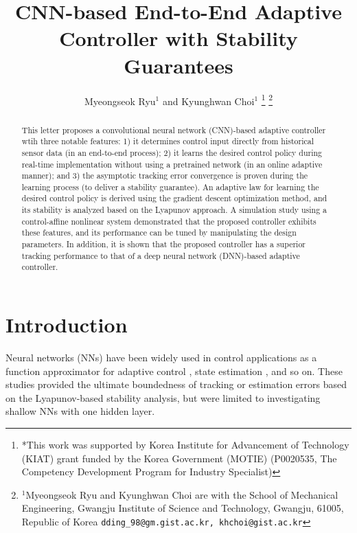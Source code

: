 \documentclass[letterpaper, 10 pt, conference]{ieeeconf}  %
\title{\LARGE \bf
CNN-based End-to-End Adaptive Controller with Stability Guarantees
}
\author{Myeongseok Ryu$^{1}$ and Kyunghwan Choi$^{1}$%
\thanks{*This work was supported by Korea Institute for Advancement of Technology (KIAT) grant funded by the Korea Government (MOTIE) (P0020535, The Competency Development Program for Industry Specialist)}%
\thanks{$^{1}$Myeongseok Ryu and Kyunghwan Choi are with the School of Mechanical Engineering, 
        Gwangju Institute of Science and Technology, Gwangju, 61005, Republic of Korea
        {\tt\small dding\_98@gm.gist.ac.kr, khchoi@gist.ac.kr}}%
}
\begin{document}
\newtheorem{theorem}{Theorem}
\newtheorem{remark}{Remark}
\newtheorem{assum}{Assmption}

\maketitle
\thispagestyle{empty}
\pagestyle{empty}


\begin{abstract}

This letter proposes a convolutional neural network (CNN)-based adaptive controller wtih three notable features: 1) it determines control input directly from historical sensor data (in an end-to-end process); 2) it learns the desired control policy during real-time implementation without using a pretrained network (in an online adaptive manner); and 3) the asymptotic tracking error convergence is proven during the learning process (to deliver a stability guarantee). An adaptive law for learning the desired control policy is derived using the gradient descent optimization method, and its stability is analyzed based on the Lyapunov approach. A simulation study using a control-affine nonlinear system demonstrated that the proposed controller exhibits these features, and its performance can be tuned by manipulating the design parameters. In addition, it is shown that the proposed controller has a superior tracking performance to that of a deep neural network (DNN)-based adaptive controller.

\end{abstract}

\section{Introduction}

Neural networks (NNs) have been widely used in control applications as a function approximator for adaptive control \cite{BookEKcontrol}, state estimation \cite{BoockEKestimation}, and so on. 
These studies provided the ultimate boundedness of tracking or estimation errors based on the Lyapunov-based stability analysis, but were limited to investigating shallow NNs with one hidden layer.
\end{document}
